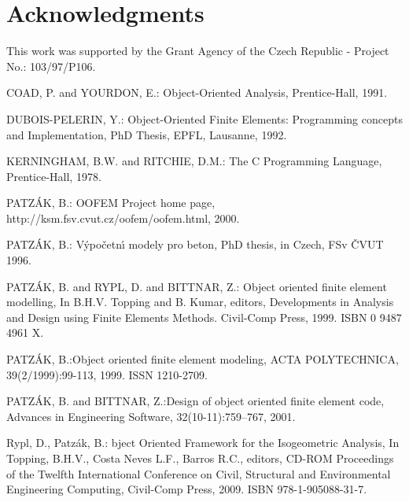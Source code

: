\documentclass[a4paper]{article}
\begin{document}
\clearpage



\section*{Acknowledgments}
This work was supported by the Grant Agency of the Czech Republic -
Project No.: 103/97/P106.

{}
\begin{thebibliography}{9}

COAD, P. and YOURDON, E.: {Object-Oriented Analysis,} Prentice-Hall,  1991.

DUBOIS-PELERIN, Y.: {Object-Oriented  Finite Elements:
Programming concepts and Implementation,} PhD Thesis, EPFL, Lausanne, 1992.

 KERNINGHAM, B.W. and RITCHIE, D.M.: {The C Programming
Language,} Prentice-Hall, 1978.

 PATZ\'{A}K, B.: {OOFEM Project home page,}
http://ksm.fsv.cvut.cz/oofem/oofem.html, 2000.

 PATZ\'{A}K, B.: {V\'{y}po\v{c}etn\'{\i} modely pro beton,} PhD
thesis, in Czech, FSv \v{C}VUT 1996. 

 PATZ\'{A}K, B. and RYPL, D. and BITTNAR, Z.: {Object
oriented finite element modelling,} In B.H.V. Topping and B. Kumar, editors,
Developments in Analysis and Design using Finite Elements
Methods. Civil-Comp Press, 1999. ISBN 0 9487 4961 X. 

 PATZ\'{A}K, B.:{Object oriented finite element modeling,} ACTA POLYTECHNICA, 39(2/1999):99-113, 1999. ISSN
1210-2709. 

 PATZ\'{A}K, B. and BITTNAR, Z.:{Design of object
oriented finite element code}, Advances in Engineering Software,
32(10-11):759--767, 2001. 

 Rypl, D., Patz\'{a}k, B.: {bject Oriented Framework for the Isogeometric Analysis}, In Topping, B.H.V., Costa Neves L.F., Barros R.C., editors, CD-ROM Proceedings of the Twelfth International Conference on Civil, Structural and Environmental Engineering Computing, Civil-Comp Press, 2009. ISBN 978-1-905088-31-7.


\end{thebibliography}
\end{document}
